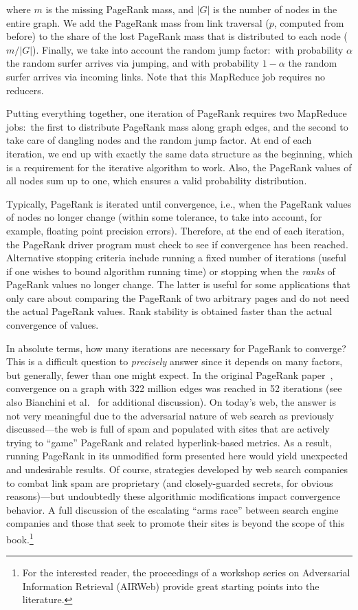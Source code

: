 \noindent where $m$ is the missing PageRank mass, and $|G|$ is the
number of nodes in the entire graph.  We add the PageRank mass from
link traversal ($p$, computed from before) to the share of the lost
PageRank mass that is distributed to each node ($m/|G|$).  Finally, we
take into account the random jump factor:\ with probability $\alpha$
the random surfer arrives via jumping, and with probability $1-\alpha$
the random surfer arrives via incoming links.  Note that this
MapReduce job requires no reducers.

Putting everything together, one iteration of PageRank requires two
MapReduce jobs:\ the first to distribute PageRank mass along graph
edges, and the second to take care of dangling nodes and the random
jump factor.  At end of each iteration, we end up with
exactly the same data structure as the beginning, which is a
requirement for the iterative algorithm to work.  Also, the PageRank
values of all nodes sum up to one, which ensures a valid probability
distribution.

Typically, PageRank is iterated until convergence, i.e., when the
PageRank values of nodes no longer change (within some tolerance, to
take into account, for example, floating point precision errors).
Therefore, at the end of each iteration, the PageRank driver program
must check to see if convergence has been reached.  Alternative
stopping criteria include running a fixed number of iterations (useful
if one wishes to bound algorithm running time) or stopping when the
\emph{ranks} of PageRank values no longer change.  The latter is useful
for some applications that only care about comparing the PageRank of
two arbitrary pages and do not need the actual PageRank values.  Rank
stability is obtained faster than the actual convergence of values.

In absolute terms, how many iterations are necessary for PageRank to
converge?  This is a difficult question to \emph{precisely} answer
since it depends on many factors, but generally, fewer than one might
expect.  In the original PageRank paper~\cite{Page_etal_1999},
convergence on a graph with 322 million edges was reached in 52
iterations (see also Bianchini et al.~\cite{Bianchini_etal_2005} for
additional discussion).  On today's web, the answer is not very
meaningful due to the adversarial nature of web search as previously
discussed---the web is full of spam and populated with sites that are
actively trying to ``game'' PageRank and related hyperlink-based
metrics.  As a result, running PageRank in its unmodified form
presented here would yield unexpected and undesirable results.  Of
course, strategies developed by web search companies to combat link
spam are proprietary (and closely-guarded secrets, for obvious
reasons)---but undoubtedly these algorithmic modifications impact
convergence behavior.  A full discussion of the escalating ``arms
race'' between search engine companies and those that seek to promote
their sites is beyond the scope of this book.\footnote{For the
  interested reader, the proceedings of a workshop series on
  Adversarial Information Retrieval (AIRWeb) provide great starting
  points into the literature.}


